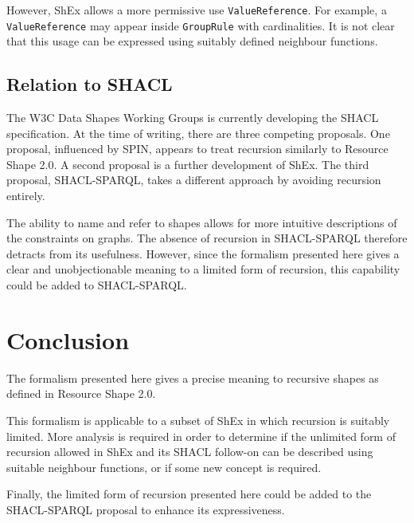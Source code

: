 \documentclass{article}
\begin{document}
However, ShEx allows a more permissive use {\tt ValueReference}. 
For example, a {\tt ValueReference} may appear inside {\tt GroupRule} with cardinalities.
It is not clear that this usage can be expressed using suitably defined neighbour functions.

\subsection{Relation to SHACL}

The W3C Data Shapes Working Groups is currently developing the SHACL specification.
At the time of writing, there are three competing proposals.
One proposal, influenced by SPIN, appears to treat recursion similarly to Resource Shape 2.0.
A second proposal is a further development of ShEx.
The third proposal, SHACL-SPARQL, takes a different approach by avoiding recursion entirely.

The ability to name and refer to shapes allows for more intuitive descriptions of the constraints on graphs.
The absence of recursion in SHACL-SPARQL therefore detracts from its usefulness.
However, since the formalism presented here gives a clear and unobjectionable meaning to a
limited form of recursion, this capability could be added to SHACL-SPARQL.

\section{Conclusion}
\label{sec-conclusion}

The formalism presented here gives a precise meaning to recursive shapes as defined in Resource Shape 2.0.

This formalism is applicable to a subset of ShEx in which recursion is suitably limited.
More analysis is required in order to determine if the unlimited form of recursion allowed in ShEx and its SHACL follow-on
can be described using suitable neighbour functions, or if some new concept is required.

Finally, the limited form of recursion presented here could be added to the SHACL-SPARQL proposal to enhance its
expressiveness.


\end{document}
